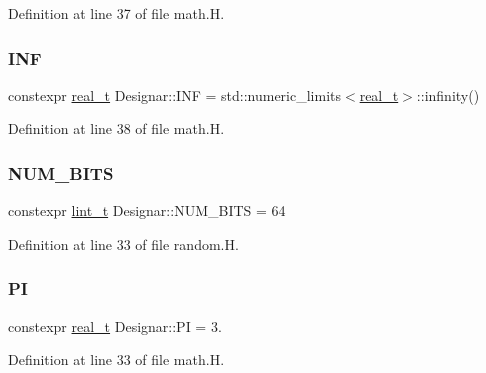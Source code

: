 Definition at line 37 of file math.\+H.

\mbox{\label{namespace_designar_a74903000a6e8d8117bb29540ef1d07ae}} 
\subsubsection{\texorpdfstring{I\+NF}{INF}}
{\footnotesize\ttfamily constexpr \hyperlink{namespace_designar_aca2c32af26808dbec1f3a3071fad25ce}{real\+\_\+t} Designar\+::\+I\+NF = std\+::numeric\+\_\+limits$<$\hyperlink{namespace_designar_aca2c32af26808dbec1f3a3071fad25ce}{real\+\_\+t}$>$\+::infinity()}



Definition at line 38 of file math.\+H.

\mbox{\label{namespace_designar_abb77bd8c0a61847409c6dcb779b66974}} 
\subsubsection{\texorpdfstring{N\+U\+M\+\_\+\+B\+I\+TS}{NUM\_BITS}}
{\footnotesize\ttfamily constexpr \hyperlink{namespace_designar_a9d113d66a39e82b73727c72cd3a52f73}{lint\+\_\+t} Designar\+::\+N\+U\+M\+\_\+\+B\+I\+TS = 64}



Definition at line 33 of file random.\+H.

\mbox{\label{namespace_designar_a2085e876f193b2212cd11dd2770b2d0b}} 
\subsubsection{\texorpdfstring{PI}{PI}}
{\footnotesize\ttfamily constexpr \hyperlink{namespace_designar_aca2c32af26808dbec1f3a3071fad25ce}{real\+\_\+t} Designar\+::\+PI = 3.}



Definition at line 33 of file math.\+H.

\mbox{\label{namespace_designar_acdac587da03b3c280ba8c4b2ef3f6983}} 
